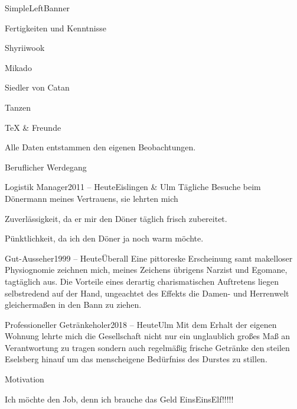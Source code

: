 \documentclass[overclock]{Lilly}
\begin{document}
{\begin{application}{SimpleLeftBanner}
\begin{block}[\faTasks]{Fertigkeiten und Kenntnisse}
\begin{bulletpoints}[2]
        \item Shyriiwook 
        \item Mikado 
        \item Siedler von Catan 
        \item Tanzen 
        \item \TeX{} \& Freunde 
    \end{bulletpoints}
    \begin{flushright}\vskip-0.25cm
        Alle Daten entstammen den eigenen Beobachtungen.\hspace*{1cm}
    \end{flushright}
\end{block}
\begin{block}[\faSuitcase]{Beruflicher Werdegang}
    \begin{timeline}
        \begin{event}{Logistik Manager}{2011 -- Heute}{Eislingen \& Ulm}
            Tägliche Besuche beim Dönermann meines Vertrauens, sie lehrten mich \begin{bulletpoints}
                \item Zuverlässigkeit, da er mir den Döner täglich frisch zubereitet.
                \item Pünktlichkeit, da ich den Döner ja noch warm möchte.
            \end{bulletpoints}
        \end{event}
        \begin{event}{Gut-Ausseher}{1999 -- Heute}{Überall}
            Eine pittoreske Erscheinung samt makelloser Physiognomie zeichnen mich, meines Zeichens übrigens Narzist und Egomane, tagtäglich aus. Die Vorteile eines derartig charismatischen Auftretens liegen selbstredend auf der Hand, ungeachtet des Effekts die Damen- und Herrenwelt gleichermaßen in den Bann zu ziehen.
        \end{event}
        \smallskip\begin{event}{Professioneller Getränkeholer}{2018 -- Heute}{Ulm}
            Mit dem Erhalt der eigenen Wohnung lehrte mich die Gesellschaft nicht nur ein unglaublich großes Maß an Verantwortung zu tragen sondern auch regelmäßig frische Getränke den steilen Eselsberg hinauf um das menscheigene Bedürfniss des Durstes zu stillen.
        \end{event}
    \end{timeline}
\end{block}
\begin{block}[\faThumbsOUp]{Motivation}
    \begin{text}
        Ich möchte den Job, denn ich brauche das Geld EinsEinsElf!!!!!\blindtext{}
    \end{text}
\end{block}
\end{application}
}
\end{document}
